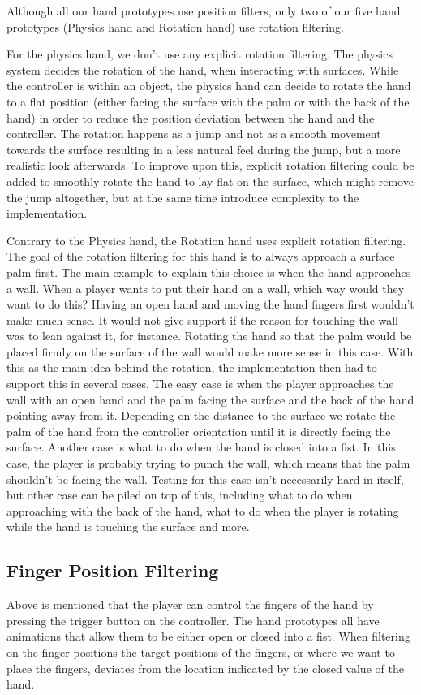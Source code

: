 Although all our hand prototypes use position filters, only two of our five hand prototypes (Physics hand and Rotation hand) use rotation filtering.

For the physics hand, we don't use any explicit rotation filtering. The physics system decides the rotation of the hand, when interacting with surfaces. While the controller is within an object, the physics hand can decide to rotate the hand to a flat position (either facing the surface with the palm or with the back of the hand) in order to reduce the position deviation between the hand and the controller. The rotation happens as a jump and not as a smooth movement towards the surface resulting in a less natural feel during the jump, but a more realistic look afterwards. To improve upon this, explicit rotation filtering could be added to smoothly rotate the hand to lay flat on the surface, which might remove the jump altogether, but at the same time introduce complexity to the implementation.

Contrary to the Physics hand, the Rotation hand uses explicit rotation filtering. The goal of the rotation filtering for this hand is to always approach a surface palm-first. The main example to explain this choice is when the hand approaches a wall. When a player wants to put their hand on a wall, which way would they want to do this? Having an open hand and moving the hand fingers first wouldn't make much sense. It would not give support if the reason for touching the wall was to lean against it, for instance. Rotating the hand so that the palm would be placed firmly on the surface of the wall would make more sense in this case. With this as the main idea behind the rotation, the implementation then had to support this in several cases. The easy case is when the player approaches the wall with an open hand and the palm facing the surface and the back of the hand pointing away from it. Depending on the distance to the surface we rotate the palm of the hand from the controller orientation until it is directly facing the surface. Another case is what to do when the hand is closed into a fist. In this case, the player is probably trying to punch the wall, which means that the palm shouldn't be facing the wall. Testing for this case isn't necessarily hard in itself, but other case can be piled on top of this, including what to do when approaching with the back of the hand, what to do when the player is rotating while the hand is touching the surface and more.

\subsection{Finger Position Filtering}
\label{subsec:categoryFingerFiltering}
Above is mentioned that the player can control the fingers of the hand by pressing the trigger button on the controller. The hand prototypes all have animations that allow them to be either open or closed into a fist. When filtering on the finger positions the target positions of the fingers, or where we want to place the fingers, deviates from the location indicated by the closed value of the hand.

